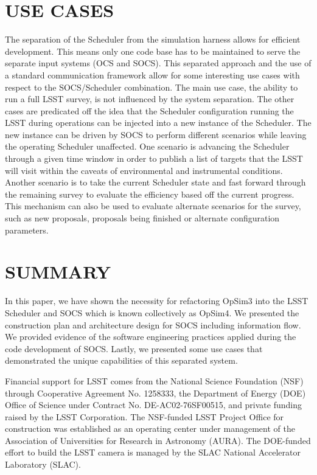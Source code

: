 \documentclass[]{spie}  %
\begin{document}
\section{USE CASES}

The separation of the Scheduler from the simulation harness allows for efficient development. This means only one code base has to be maintained to serve the separate input systems (OCS and SOCS). This separated approach and the use of a standard communication framework allow for some interesting use cases with respect to the SOCS/Scheduler combination. The main use case, the ability to run a full LSST survey, is not influenced by the system separation. The other cases are predicated off the idea that the Scheduler configuration running the LSST during operations can be injected into a new instance of the Scheduler. The new instance can be driven by SOCS to perform different scenarios while leaving the operating Scheduler unaffected. One scenario is advancing the Scheduler through a given time window in order to publish a list of targets that the LSST will visit within the caveats of environmental and instrumental conditions. Another scenario is to take the current Scheduler state and fast forward through the remaining survey to evaluate the efficiency based off the current progress. This mechanism can also be used to evaluate alternate scenarios for the survey, such as new proposals, proposals being finished or alternate configuration parameters.

\section{SUMMARY}

In this paper, we have shown the necessity for refactoring OpSim3 into the LSST Scheduler and SOCS which is known collectively as OpSim4. We presented the construction plan and architecture design for SOCS including information flow. We provided evidence of the software engineering practices applied during the code development of SOCS. Lastly, we presented some use cases that demonstrated the unique capabilities of this separated system. 

\acknowledgments %

Financial support for LSST comes from the National Science Foundation (NSF) through Cooperative Agreement No. 1258333, the Department of Energy (DOE) Office of Science under Contract No. DE-AC02-76SF00515, and private funding raised by the LSST Corporation. The NSF-funded LSST Project Office for construction was established as an operating center under management of the Association of Universities for Research in Astronomy (AURA).  The DOE-funded effort to build the LSST camera is managed by the SLAC National Accelerator Laboratory (SLAC).    

\end{document}

